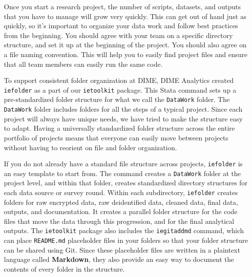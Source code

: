 Once you start a research project,
the number of scripts, datasets, and outputs
that you have to manage will grow very quickly.
This can get out of hand just as quickly,
so it's important to organize your data work
and follow best practices from the beginning.
You should agree with your team on a specific directory structure,
and set it up at the beginning of the project.
You should also agree on a file naming convention.
This will help you to easily find project files and
ensure that all team members can easily run the same code.

To support consistent folder organization at DIME,
DIME Analytics created \texttt{iefolder}
as a part of our \texttt{ietoolkit} package.
This Stata command sets up a pre-standardized folder structure
for what we call the \texttt{DataWork} folder.
The \texttt{DataWork} folder includes folders for all the steps of a typical project.
Since each project will always have unique needs,
we have tried to make the structure easy to adapt.
Having a universally standardized folder structure
across the entire portfolio of projects
means that everyone can easily move between projects
without having to reorient on file and folder organization.

If you do not already have a standard file structure across projects,
\texttt{iefolder} is an easy template to start from.
The command creates a \texttt{DataWork} folder at the project level,
and within that folder, creates standardized directory structures
for each data source or survey round.
Within each subdirectory, \texttt{iefolder} creates folders for raw encrypted data,
raw deidentified data, cleaned data, final data, outputs, and documentation.
It creates a parallel folder structure for the code files
that move the data through this progression,
and for the final analytical outputs.
The \texttt{ietoolkit} package also includes the \texttt{iegitaddmd} command,
which can place \texttt{README.md} placeholder files in your folders so that
your folder structure can be shared using Git.
Since these placeholder files are written in a plaintext language called \textbf{Markdown},
they also provide an easy way to document the contents of every folder in the structure.

